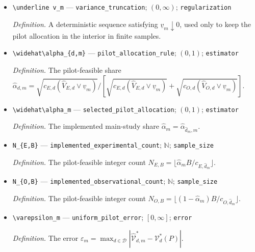 \documentclass{article}
\begin{document}
\begin{itemize}
  \item \texttt{\textbackslash{}\allowbreak{}underline v\_\allowbreak{}m} --- \texttt{variance\_\allowbreak{}truncation}; \((0,\infty)\); \texttt{regularization}
  \par\smallskip\noindent\emph{Definition.} A deterministic sequence satisfying \(\underline v_m\downarrow0\), used only to keep the pilot allocation in the interior in finite samples.
  \item \texttt{\textbackslash{}\allowbreak{}widehat\textbackslash{}\allowbreak{}alpha\_\allowbreak{}\{d,\allowbreak{}m\}\allowbreak{}} --- \texttt{pilot\_\allowbreak{}allocation\_\allowbreak{}rule}; \((0,1)\); \texttt{estimator}
  \par\smallskip\noindent\emph{Definition.} The pilot-feasible share \(\widehat\alpha_{d,m}=\sqrt{c_{E,d}(\widehat V_{E,d}\vee\underline v_m)}/[\sqrt{c_{E,d}(\widehat V_{E,d}\vee\underline v_m)}+\sqrt{c_{O,d}(\widehat V_{O,d}\vee\underline v_m)}]\).
  \item \texttt{\textbackslash{}\allowbreak{}widehat\textbackslash{}\allowbreak{}alpha\_\allowbreak{}m} --- \texttt{selected\_\allowbreak{}pilot\_\allowbreak{}allocation}; \((0,1)\); \texttt{estimator}
  \par\smallskip\noindent\emph{Definition.} The implemented main-study share \(\widehat\alpha_m=\widehat\alpha_{\widehat d_m,m}\).
  \item \texttt{N\_\allowbreak{}\{E,\allowbreak{}B\}\allowbreak{}} --- \texttt{implemented\_\allowbreak{}experimental\_\allowbreak{}count}; \(\mathbb N\); \texttt{sample\_\allowbreak{}size}
  \par\smallskip\noindent\emph{Definition.} The pilot-feasible integer count \(N_{E,B}=\lfloor\widehat\alpha_m B/c_{E,\widehat d_m}\rfloor\).
  \item \texttt{N\_\allowbreak{}\{O,\allowbreak{}B\}\allowbreak{}} --- \texttt{implemented\_\allowbreak{}observational\_\allowbreak{}count}; \(\mathbb N\); \texttt{sample\_\allowbreak{}size}
  \par\smallskip\noindent\emph{Definition.} The pilot-feasible integer count \(N_{O,B}=\lfloor(1-\widehat\alpha_m)B/c_{O,\widehat d_m}\rfloor\).
  \item \texttt{\textbackslash{}\allowbreak{}varepsilon\_\allowbreak{}m} --- \texttt{uniform\_\allowbreak{}pilot\_\allowbreak{}error}; \([0,\infty]\); \texttt{error}
  \par\smallskip\noindent\emph{Definition.} The error \(\varepsilon_m=\max_{d\in\mathcal D}|\widehat{\mathcal V}_{d,m}^*-\mathcal V_d^*(P)|\).

\end{itemize}
\end{document}
